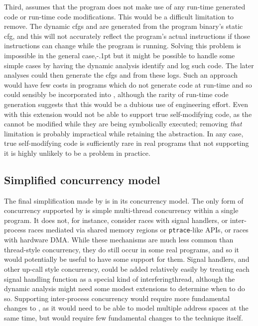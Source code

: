 Third, {\implementation} assumes that the program does not make use of
any run-time generated code or run-time code modifications.  This
would be a difficult limitation to remove.  The \glspl{dynamic cfg}
and {\StateMachines} are generated from the program binary's
\gls{static cfg}, and this will not accurately reflect the program's
actual instructions if those instructions can change while the program
is running.  Solving this problem is impossible in the general
case,\kern-.1pt but it
might be possible to handle some simple cases by having the dynamic
analysis identify and log such code.  The later analyses could then
generate the \glspl{cfg} and {\StateMachines} from these logs.  Such
an approach would have few costs in programs which do not generate
code at run-time and so could sensibly be incorporated into
{\implementation}, although the rarity of run-time code generation
suggests that this would be a dubious use of engineering effort.  Even
with this extension {\implementation} would not be able to support
true self-modifying code, as the {\StateMachines} cannot be modified
while they are being symbolically executed; removing \emph{that}
limitation is probably impractical while retaining the {\StateMachine}
abstraction.  In any case, true self-modifying code is sufficiently
rare in real programs that not supporting it is highly unlikely to be
a problem in practice.

\subsection{Simplified concurrency model}
The final simplification made by {\implementation} is in its
concurrency model.  The only form of concurrency supported by
{\implementation} is simple multi-thread concurrency within a single
program.  It does not, for instance, consider races with signal
handlers, or inter-process races mediated via shared memory regions or
\texttt{ptrace}-like APIs, or races with hardware DMA.  While these
mechanisms are much less common than thread-style concurrency, they do
still occur in some real programs, and so it would potentially be
useful to have some support for them.  Signal handlers, and other
up-call style concurrency, could be added relatively easily by
treating each signal handling function as a special kind of
\gls{interferingthread}, although the dynamic analysis might need some
modest extensions to determine when to do so.  Supporting
inter-process concurrency would require more fundamental changes to
{\implementation}, as it would need to be able to model multiple
address spaces at the same time, but would require few fundamental
changes to the {\technique} technique itself.

